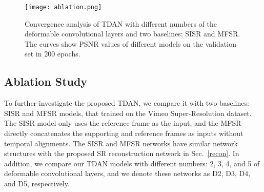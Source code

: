 \documentclass[10pt,twocolumn,letterpaper]{article}
\begin{document}
\begin{table}
\begin{center}
\end{center}
\caption{PSNR (dB) and SSIM of different networks with upscale factor 4 on the BD configuration. Values of the FSRVSR are from the original paper.}
\label{BD}
\end{table}
\begin{table}
\begin{center}
\end{center}
\caption{Parameter numbers () of several networks with leading VSR performance.}
\label{size}
\vspace{-5mm}
\end{table}
\begin{figure}[h]
\centering
\texttt{[image: ablation.png]}
\caption{Convergence analysis of TDAN with different numbers of the deformable convolutional layers and two baselines: SISR and MFSR. The curves show PSNR values of different models on the validation set in 200 epochs.}
\label{curve}
\end{figure}



\subsection{Ablation Study}
\label{ablation}
To further investigate the proposed TDAN, we compare it with two baselines: SISR and MFSR models, that trained on the Vimeo Super-Resolution dataset. The SISR model only uses the reference frame as the input, and the MFSR directly concatenates the supporting and reference frames as inputs without temporal alignments. The SISR and MFSR networks have similar network structures with the proposed SR reconstruction network in Sec.~\ref{recon}. In addition, we compare our TDAN models with different numbers: 2, 3, 4, and 5 of deformable convolutional layers, and we denote these networks as D2, D3, D4, and D5, respectively.
\end{document}
